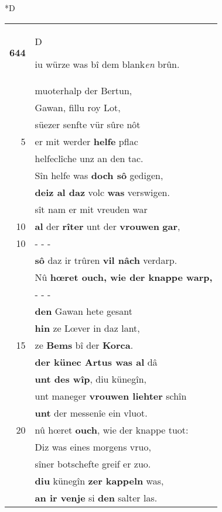 \documentclass[8pt,a4paper,notitlepage]{article}
\begin{document}
\begin{table}[ht]
\begin{minipage}[t]{0.5\linewidth}
\small
\begin{center}*D
\end{center}
\begin{tabular}{rl}
\textbf{644} & \begin{large}D\end{large}iu würze was bî dem blank\textit{en} brûn.\\ 
 & muoterhalp der Bertun,\\ 
 & Gawan, fillu roy Lot,\\ 
 & süezer senfte vür sûre nôt\\ 
5 & er mit werder \textbf{helfe} pflac\\ 
 & helfeclîche unz an den tac.\\ 
 & Sîn helfe was \textbf{doch sô} gedigen,\\ 
 & \textbf{deiz al daz} volc \textbf{was} verswigen.\\ 
 & sît nam er mit vreuden war\\ 
10 & \textbf{al} der \textbf{rîter} unt der \textbf{vrouwen} \textbf{gar},\\ 
10 & \multicolumn{1}{l}{ - - - }\\ 
 & \textbf{sô} daz ir trûren \textbf{vil nâch} verdarp.\\ 
 & Nû \textbf{hœret ouch, wie der knappe warp,}\\ 
 & \multicolumn{1}{l}{ - - - }\\ 
 & \textbf{den} Gawan hete gesant\\ 
 & \textbf{hin} ze Lœver in daz lant,\\ 
15 & ze \textbf{Bems} bî der \textbf{Korca}.\\ 
 & \textbf{der künec Artus was al} dâ\\ 
 & \textbf{unt des wîp}, diu künegîn,\\ 
 & unt maneger \textbf{vrouwen liehter} schîn\\ 
 & \textbf{unt} der messenîe ein vluot.\\ 
20 & nû hœret \textbf{ouch}, wie der knappe tuot:\\ 
 & Diz was eines morgens vruo,\\ 
 & sîner botschefte greif er zuo.\\ 
 & \textbf{diu} künegîn \textbf{zer kappeln} was,\\ 
 & \textbf{an ir venje} si \textbf{den} salter las.\\ 

\end{tabular}
\end{minipage}
\end{table}
\end{document}
